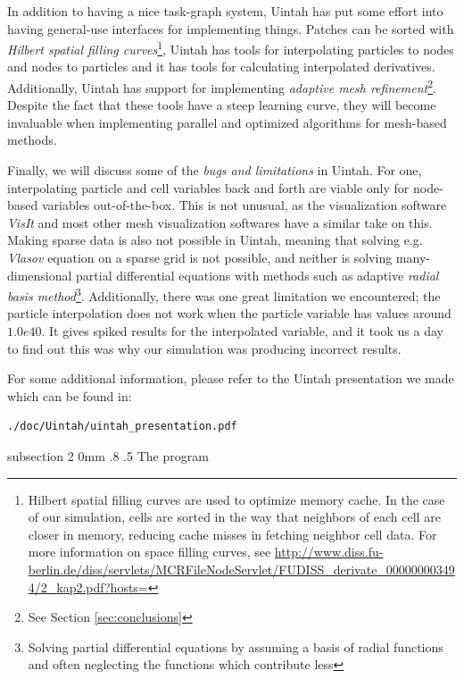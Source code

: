 \documentclass[notitlepage, 12pt]{article}
\makeatletter
\renewcommand{\subsection}{\@startsection    %
        {subsection}
        {2}
        {0mm}
        {.8\baselineskip}
        {.5\baselineskip}
        {\bfseries\normalsize}}
\makeatother
\begin{document}
In addition to having a nice task-graph system, Uintah has put some effort into having general-use interfaces for implementing things. Patches can be sorted 
with \emph{Hilbert spatial filling curves}\footnote{Hilbert spatial filling curves are used to optimize memory cache. In the case of our simulation, cells 
are sorted in the way that neighbors of each cell are closer in memory, reducing cache misses in fetching neighbor cell data. For more information on 
space filling curves, see \url{http://www.diss.fu-berlin.de/diss/servlets/MCRFileNodeServlet/FUDISS_derivate_000000003494/2_kap2.pdf?hosts=}}, Uintah has tools for interpolating particles to nodes and nodes to particles and it has tools for calculating 
interpolated derivatives. Additionally, Uintah has support for implementing \emph{adaptive mesh refinement}\footnote{See Section \ref{sec:conclusions}}. 
Despite the fact that these tools have a steep learning curve, they will become invaluable when implementing parallel and optimized algorithms for 
mesh-based methods.

Finally, we will discuss some of the \emph{bugs and limitations} in Uintah. For one, interpolating particle and cell variables back and forth are viable only 
for node-based variables out-of-the-box. This is not unusual, as the visualization software \emph{VisIt} and most other mesh visualization softwares have 
a similar take on this. Making sparse data is also not possible in Uintah, meaning that solving e.g. \emph{Vlasov} equation on a sparse grid is not 
possible, and neither is solving many-dimensional partial differential equations with methods such as adaptive \emph{radial basis method}\footnote{Solving 
partial differential equations by assuming a basis of radial functions and often neglecting the functions which contribute less}. Additionally, there 
was one great limitation we encountered; the particle interpolation does not work when the particle variable has values around $1.0e40$. It gives spiked 
results for the interpolated variable, and it took us a day to find out this was why our simulation was producing incorrect results.

For some additional information, please refer to the Uintah presentation we 
made which can be found in:

\begin{verbatim}
./doc/Uintah/uintah_presentation.pdf
\end{verbatim}


\subsection{The program}
\end{document}
